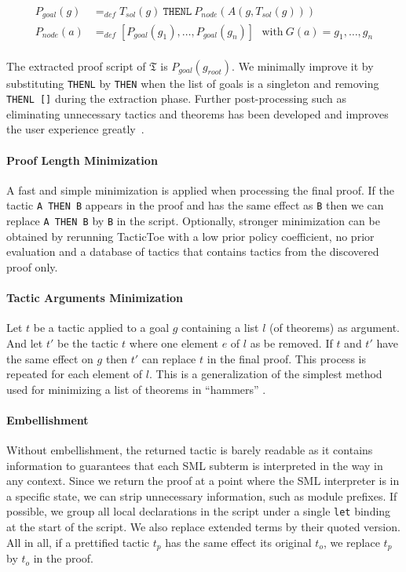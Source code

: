 \documentclass[runningheads,a4paper,draft]{svjour3}
\def\sml{\textsf{SML}\xspace}
\def\tactictoe{\textsf{TacticToe}\xspace}
\begin{document}
\begin{align*}
P_{goal}(g) &=_{def} T_{sol}(g)\ \texttt{THENL}\ P_{node}(A(g,T_{sol}(g)))\\
P_{node}(a) &=_{def} [P_{goal}(g_1),\ldots,P_{goal}(g_n)]\ \ \ \text{with}\
G(a) = g_1,\ldots,g_n\\
\end{align*}

The extracted proof script of $\mathfrak{T}$ is $P_{goal}(g_{root})$.
We minimally improve it by substituting \texttt{THENL} by \texttt{THEN} when the
list of goals is a singleton and removing \texttt{THENL []} during the
extraction phase.
Further post-processing such as
eliminating unnecessary tactics and theorems has been developed and
improves the user experience greatly~\cite{DBLP:conf/sefm/Adams15}.

\paragraph{Proof Length Minimization}
A fast and simple minimization is applied when processing the final proof. If
the tactic \texttt{A THEN B} appears in the proof and has the same effect as
\texttt{B} then we can replace \texttt{A THEN B} by \texttt{B} in the script.
Optionally, stronger minimization can be obtained
by rerunning \tactictoe with a low prior
policy coefficient, no prior evaluation and a database of tactics that contains
tactics from the discovered proof only.

\paragraph{Tactic Arguments Minimization}
Let $t$ be a tactic applied to a goal $g$ containing a list $l$ (of theorems)
as argument. And let $t'$ be the tactic $t$ where one element $e$ of $l$ as be
removed. If $t$ and $t'$ have the same effect on $g$ then $t'$ can replace $t$
in the final proof. This process is repeated for each element of $l$.
This is a generalization of the simplest method used for minimizing a list of
theorems in ``hammers'' \cite{hammers4qed}.

\paragraph{Embellishment}
Without embellishment, the returned tactic is barely readable as it contains
information to guarantees that each \sml subterm is interpreted in the way in
any context. Since we return the proof at a point where the \sml interpreter is
in a specific state, we can strip unnecessary information, such as
module prefixes. If possible, we group all local declarations in the
script under a single \texttt{let} binding at the start of the script. We
also replace extended terms by their quoted version.
All in all, if a prettified tactic $t_p$ has the same effect its original
$t_o$, we replace $t_p$ by $t_o$ in the proof.\\
\end{document}
